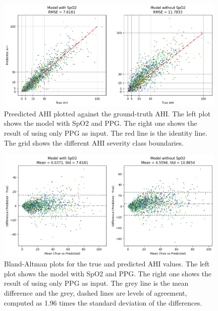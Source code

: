 \begin{figure}
    \centering
    \includegraphics[width=\textwidth]{images/AhiPlots}
    \caption{Preedicted AHI plotted against the ground-truth AHI. The left plot shows the model with SpO2 and PPG. The right one shows the result of using only PPG as input. The red line is the identity line. The grid shows the different AHI severity class boundaries.}
    \label{fig:ahi-plots}
\end{figure}

\begin{figure}
    \centering
    \includegraphics[width=\textwidth]{images/BlandAltmanPlots}
    \caption{Bland-Altman plots for the true and predicted AHI values. The left plot shows the model with SpO2 and PPG. The right one shows the result of using only PPG as input. The grey line is the mean difference and the grey, dashed lines are levels of agreement, computed as 1.96 times the standard deviation of the differences.}
    \label{fig:bland-altman-plots}
\end{figure}

